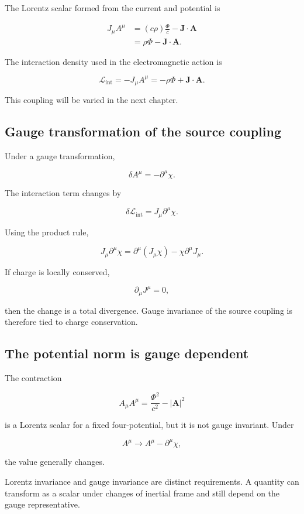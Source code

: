 The Lorentz scalar formed from the current and potential is

\[
\begin{aligned}
J_{\mu}A^{\mu}
&=
(c\rho)
\frac{\Phi}{c}
-
\mathbf{J}\cdot\mathbf{A}\\
&=
\rho\Phi
-
\mathbf{J}\cdot\mathbf{A}.
\end{aligned}
\]

The interaction density used in the electromagnetic action is

\[
\boxed{
\mathcal{L}_{\mathrm{int}}
=
-J_{\mu}A^{\mu}
=
-\rho\Phi
+
\mathbf{J}\cdot\mathbf{A}
}.
\]

This coupling will be varied in the next chapter.

\subsection{Gauge transformation of the source coupling}

Under a gauge transformation,

\[
\delta A^{\mu}
=
-\partial^{\mu}\chi.
\]

The interaction term changes by

\[
\delta\mathcal{L}_{\mathrm{int}}
=
J_{\mu}\partial^{\mu}\chi.
\]

Using the product rule,

\[
J_{\mu}\partial^{\mu}\chi
=
\partial^{\mu}
\left(
J_{\mu}\chi
\right)
-
\chi\partial^{\mu}J_{\mu}.
\]

If charge is locally conserved,

\[
\partial_{\mu}J^{\mu}=0,
\]

then the change is a total divergence. Gauge invariance of the source coupling is therefore tied to charge conservation.

\subsection{The potential norm is gauge dependent}

The contraction

\[
A_{\mu}A^{\mu}
=
\frac{\Phi^2}{c^2}
-
|\mathbf{A}|^2
\]

is a Lorentz scalar for a fixed four-potential, but it is not gauge invariant. Under

\[
A^{\mu}
\longrightarrow
A^{\mu}-\partial^{\mu}\chi,
\]

the value generally changes.

Lorentz invariance and gauge invariance are distinct requirements. A quantity can transform as a scalar under changes of inertial frame and still depend on the gauge representative.

